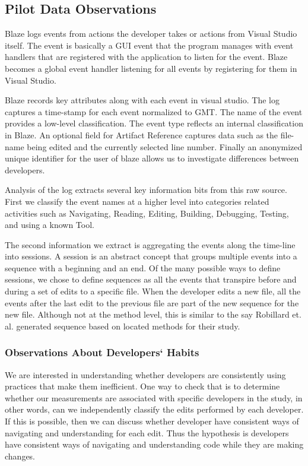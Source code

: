 \documentclass{sig-alternate}
\begin{document}
\subsection{Pilot Data Observations}

Blaze logs events from actions the developer takes or actions from Visual Studio itself.
 The event is basically a GUI event that the program manages with event handlers that are registered with the application to listen for the event.  Blaze becomes a global event handler listening for all events by registering for them in Visual Studio.  

Blaze records key attributes along with each event in visual studio.  The log captures a time-stamp for each event normalized to GMT.  The name of the event provides a low-level classification.  The event type reflects an internal classification in Blaze.  An optional field for Artifact Reference captures data such as the file-name being edited and the currently selected line number.  Finally an anonymized unique identifier for the user of blaze allows us to investigate differences between developers.

Analysis of the log extracts several key information bits from this raw source.  First we classify the event names at a higher level into categories related activities such as Navigating, Reading, Editing, Building, Debugging,  Testing, and using a  known Tool.  

The second information we extract is aggregating the events along the time-line into sessions.  A session is an abstract concept that groups multiple events into a sequence with a beginning and an end.  Of the many possible ways to define sessions, we chose to define sequences as all the events that transpire before and during a set of edits to a specific file.  When the developer edits a new file, all the events after the last edit to the previous file are part of the new sequence for the new file.  Although not at the method level, this is similar to the say Robillard et. al. generated sequence based on located methods for their study.\cite{wbsnipes:Robillard2004How}

\subsubsection{Observations About Developers` Habits}

We are interested in understanding whether developers are consistently using practices that make them inefficient.  One way to check that is to determine whether our measurements are associated with specific developers in the study, in other words, can we independently classify the edits performed by each developer.  If this is possible, then we can discuss whether developer have consistent ways of navigating and understanding for each edit.  Thus the hypothesis is developers have consistent ways of navigating and understanding code while they are making changes.
\end{document}
